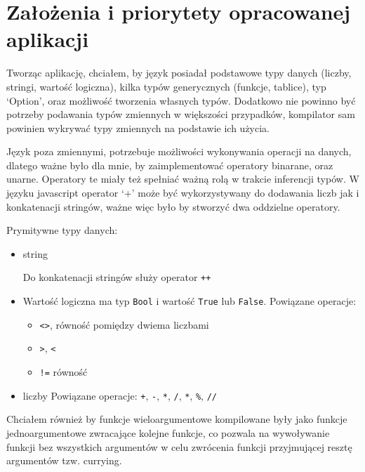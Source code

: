 \documentclass{article}
\begin{document}
\section{Założenia i priorytety opracowanej aplikacji}
Tworząc aplikację, chciałem, by język posiadał podstawowe typy danych (liczby, stringi, wartość logiczna), kilka typów generycznych (funkcje, tablice), typ `Option', oraz możliwość tworzenia własnych typów.
Dodatkowo nie powinno być potrzeby podawania typów zmiennych w większości przypadków, kompilator sam powinien wykrywać typy zmiennych na podstawie ich użycia.


Język poza zmiennymi, potrzebuje możliwości wykonywania operacji na danych, dlatego ważne było dla mnie, by zaimplementować operatory binarane, oraz unarne. Operatory te miały też spełniać ważną rolą w trakcie inferencji typów. W języku javascript operator `+' może być wykorzystywany do dodawania liczb jak i konkatenacji stringów, ważne więc było by stworzyć dwa oddzielne operatory.

Prymitywne typy danych:
\begin{itemize}
  \item string
        
        Do konkatenacji stringów służy operator \lstinline!++!
  \item Wartość logiczna ma typ \lstinline!Bool! i wartość \lstinline!True! lub \lstinline!False!.
        Powiązane operacje:
        \begin{itemize}
          \item \lstinline!<>!, równość pomiędzy dwiema liczbami
          \item \lstinline!>!, \lstinline!<!
          \item \lstinline|!=| równość
        \end{itemize}
  \item liczby
        Powiązane operacje: \lstinline!+!, \lstinline!-!, \lstinline!*!, \lstinline!/!, \lstinline!*!, \lstinline!%!, \lstinline!//!
\end{itemize}


\newpage
Chciałem również by funkcje wieloargumentowe kompilowane były jako funkcje jednoargumentowe zwracające kolejne funkcje, co pozwala na wywoływanie funkcji bez wszystkich argumentów w celu zwrócenia funkcji przyjmującej resztę argumentów tzw. currying.



\end{document}
